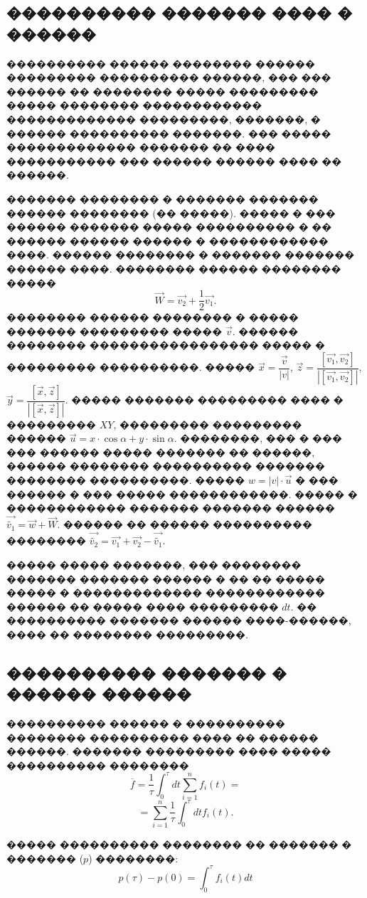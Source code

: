 \subsection{���������� ������� ���� � ������}
\indent ���������� ������ �������� ������ ��������� ���������� ������, ��� ��� ������ �� �������� ����� ��������� ����� �������� ������������ ������������� ���������, �������, � ������ ���������� �������.
��� ����� ������������� ������� �� ���� ����������� ��� ������ ������ ���� �� ������.

������� �������� � ������� ������� ������ �������� (�� �����). ����� � ��� ������ ������� ����� ���������� � �� ������ ������ ������ � ������������ ����. ������ �������� � ������� ������� ������ ����. �������� ������ �������� �����
\begin{equation}
    \vec{W} = \vec{v_2} + \dfrac{1}{2}\vec{v_1}.
\end{equation}
\indent �������� ������ �������� � ����� ������� ��������� ����� $\vec{v}$.
������ �������� ����������������� ����� � ��������� ����������. ����� $\vec{x} = \dfrac{\vec{v}}{|v|}$, $\vec{z} = \dfrac{[\vec{v_1}, \vec{v_2}]}{|[\vec{v_1}, \vec{v_2}]|}$, $\vec{y} = \dfrac{[\vec{x}, \vec{z}]}{|[\vec{x}, \vec{z}]|}$. ����� ������� ��������� ���� � ��������� $XY$, ��������� ��������� ������ $\vec{u} = x \cdot \cos \alpha + y \cdot \sin \alpha$. ��������, ��� � ��� ��� ������ ����� ������� �� ������, ������ �������� ���������� ������� �������� ����������. ����� $w = |v| \cdot \vec{u}$ � ��� ������ � ��� ����� ������������. ����� � ������������ ������� ������� ������ $\vec{\widetilde{v_1}} = \vec{w} + \vec{W}$. ������ �� ������ ���������� �������� $\vec{\widetilde{v_2}} = \vec{v_1} + \vec{v_2} - \vec{\widetilde{v_1}}$.

����� ����� �������, ��� �������� ������� ������� ������ � �� �� ����� ����� � ������������� ������������ ������ �� ����� ���� ��������� $dt$. �� ���������� ������� ������ ����-������, ���� �� �������� ���������.
\subsection{���������� ������� � ������ ������}
���������� ������ � ���������� �������� ���������� ���� �� ������ ������. ������� ��������� ���� ����� ���������� ��������
$$
\overline{f} = \dfrac{1}{\tau} \int_0^\tau dt \sum_{i=1}^n f_i(t) =$$
$$
= \sum_{i=1}^n \dfrac{1}{\tau} \int_0^\tau dt f_i(t).
$$

����� ���������� �������� �� ������� � ������� ($p$) ��������:
\[p(\tau) - p(0) = \int_0^\tau f_i(t) dt \]

